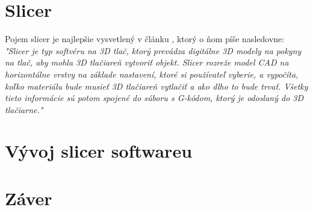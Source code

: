 \documentclass[10pt,twoside,slovak,a4paper]{article}
\begin{document}
\section{Slicer}
Pojem slicer je najlepšie vysvetlený v článku \cite{3}, ktorý o ňom píše nasledovne:
\newline
\emph{"Slicer je typ softvéru na 3D tlač, ktorý prevádza digitálne 3D modely na pokyny na tlač, aby mohla 3D tlačiareň vytvoriť objekt. Slicer rozreže model CAD na horizontálne vrstvy na základe nastavení, ktoré si používateľ vyberie, a vypočíta, koľko materiálu bude musieť 3D tlačiareň vytlačiť a ako dlho to bude trvať. Všetky tieto informácie sú potom spojené do súboru s G-kódom, ktorý je odoslaný do 3D tlačiarne."}

\section{Vývoj slicer softwareu}

\section{Záver}



\end{document}
